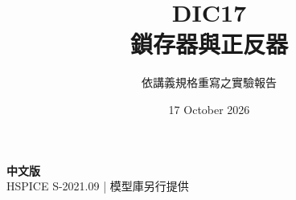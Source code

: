 \documentclass[11pt,a4paper]{article}
\title{\color{accent}DIC17\\[4pt]鎖存器與正反器}
\author{依講義規格重寫之實驗報告}
\date{17 October 2026}
\begin{document}
\maketitle
\begin{center}\small\textbf{中文版}\\
HSPICE S-2021.09 \quad | \quad 模型庫另行提供
\end{center}


\end{document}
